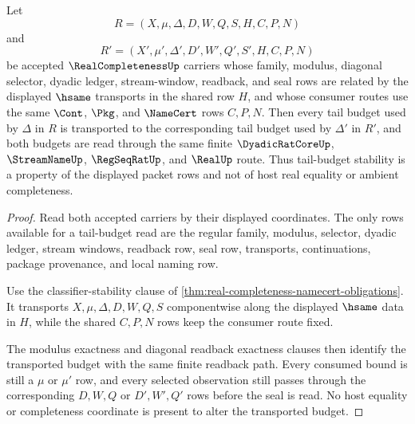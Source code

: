 \begin{theorem}
\label{thm:real-completeness-tail-budget-stability}
Let
$$
R=(X,\mu,\Delta,D,W,Q,S,H,C,P,N)
$$
and
$$
R'=(X',\mu',\Delta',D',W',Q',S',H,C,P,N)
$$
be accepted $\RealCompletenessUp$ carriers whose family, modulus, diagonal selector, dyadic ledger, stream-window, readback, and seal rows are related by the displayed $\hsame$ transports in the shared row $H$, and whose consumer routes use the same $\Cont$, $\Pkg$, and $\NameCert$ rows $C,P,N$. Then every tail budget used by $\Delta$ in $R$ is transported to the corresponding tail budget used by $\Delta'$ in $R'$, and both budgets are read through the same finite $\DyadicRatCoreUp$, $\StreamNameUp$, $\RegSeqRatUp$, and $\RealUp$ route. Thus tail-budget stability is a property of the displayed packet rows and not of host real equality or ambient completeness.
\end{theorem}
\begin{proof}
Read both accepted carriers by their displayed coordinates. The only rows available for a tail-budget read are the regular family, modulus, selector, dyadic ledger, stream windows, readback row, seal row, transports, continuations, package provenance, and local naming row.

Use the classifier-stability clause of \autoref{thm:real-completeness-namecert-obligations}. It transports $X,\mu,\Delta,D,W,Q,S$ componentwise along the displayed $\hsame$ data in $H$, while the shared $C,P,N$ rows keep the consumer route fixed.

The modulus exactness and diagonal readback exactness clauses then identify the transported budget with the same finite readback path. Every consumed bound is still a $\mu$ or $\mu'$ row, and every selected observation still passes through the corresponding $D,W,Q$ or $D',W',Q'$ rows before the seal is read. No host equality or completeness coordinate is present to alter the transported budget.
\end{proof}

